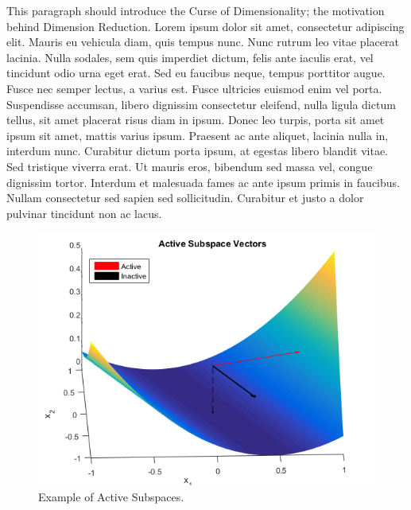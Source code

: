 \documentclass[]{aiaa-tc}%
\begin{document}
This paragraph should introduce the Curse of Dimensionality; the motivation behind Dimension Reduction. Lorem ipsum dolor sit amet, consectetur adipiscing elit. Mauris eu vehicula diam, quis tempus nunc. Nunc rutrum leo vitae placerat lacinia. Nulla sodales, sem quis imperdiet dictum, felis ante iaculis erat, vel tincidunt odio urna eget erat. Sed eu faucibus neque, tempus porttitor augue. Fusce nec semper lectus, a varius est. Fusce ultricies euismod enim vel porta. Suspendisse accumsan, libero dignissim consectetur eleifend, nulla ligula dictum tellus, sit amet placerat risus diam in ipsum. Donec leo turpis, porta sit amet ipsum sit amet, mattis varius ipsum. Praesent ac ante aliquet, lacinia nulla in, interdum nunc. Curabitur dictum porta ipsum, at egestas libero blandit vitae. Sed tristique viverra erat. Ut mauris eros, bibendum sed massa vel, congue dignissim tortor. Interdum et malesuada fames ac ante ipsum primis in faucibus. Nullam consectetur sed sapien sed sollicitudin. Curabitur et justo a dolor pulvinar tincidunt non ac lacus. 

\begin{figure}
 \includegraphics{../images/surface_plot}
 \caption{Example of Active Subspaces.}
 \label{fig:as_example}
\end{figure}
\end{document}
